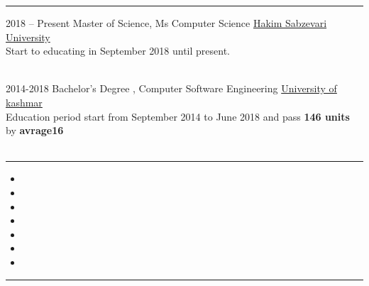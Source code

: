 \documentclass[8pt]{developercv}
\begin{document}
\noindent\rule{\textwidth}{1pt}
\vspace{-\baselineskip} 



\vspace{5pt} 

\begin{entrylist}
	\entry
	{2018 -- Present}
	{Master of Science, Ms Computer Science}
	{\href{http://www.hsu.ac.ir/en/}{Hakim Sabzevari University\\}}
	{Start to educating in September 2018 until present.\\\\}

	\entry
	{2014-2018}
	{Bachelor's Degree , Computer Software Engineering}
	{\href{http://kashmar.ac.ir/}{ University of kashmar\\}}
	{Education period start from September 2014 to June 2018 and pass \textbf{146 units} by \textbf{avrage16}\\\\}

\end{entrylist}


\vspace{35pt} 
\noindent\rule{\textwidth}{1pt}


\vspace{10pt} 

\begin{minipage}[t]{0.6\textwidth}

	\begin{itemize}

		\item {}
                     \item{}
                     \item{}
	          \item {}
		\item {}
		\item {}
		  \item{}
	\end{itemize}



\end{minipage}


\vspace{35pt} 
\noindent\rule{\textwidth}{1pt}
\end{document}
